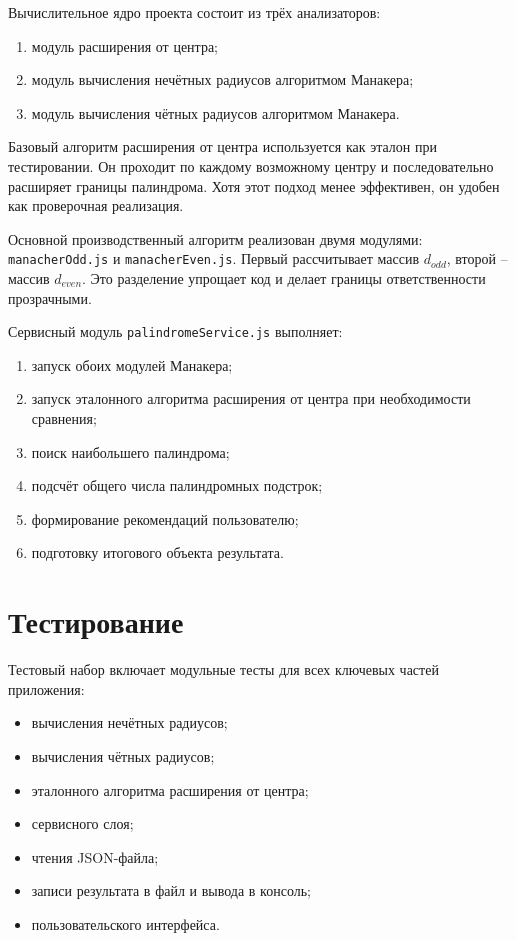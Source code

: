 Вычислительное ядро проекта состоит из трёх анализаторов:
\begin{enumerate}
    \item модуль расширения от центра;
    \item модуль вычисления нечётных радиусов алгоритмом Манакера;
    \item модуль вычисления чётных радиусов алгоритмом Манакера.
\end{enumerate}

Базовый алгоритм расширения от центра используется как эталон при тестировании.
Он проходит по каждому возможному центру и последовательно расширяет границы палиндрома.
Хотя этот подход менее эффективен, он удобен как проверочная реализация.

Основной производственный алгоритм реализован двумя модулями: \texttt{manacherOdd.js} и \texttt{manacherEven.js}.
Первый рассчитывает массив $d_{odd}$, второй -- массив $d_{even}$.
Это разделение упрощает код и делает границы ответственности прозрачными.

Сервисный модуль \texttt{palindromeService.js} выполняет:
\begin{enumerate}
    \item запуск обоих модулей Манакера;
    \item запуск эталонного алгоритма расширения от центра при необходимости сравнения;
    \item поиск наибольшего палиндрома;
    \item подсчёт общего числа палиндромных подстрок;
    \item формирование рекомендаций пользователю;
    \item подготовку итогового объекта результата.
\end{enumerate}

\section{Тестирование} \label{ch5:sec4}

Тестовый набор включает модульные тесты для всех ключевых частей приложения:
\begin{itemize}
    \item вычисления нечётных радиусов;
    \item вычисления чётных радиусов;
    \item эталонного алгоритма расширения от центра;
    \item сервисного слоя;
    \item чтения JSON-файла;
    \item записи результата в файл и вывода в консоль;
    \item пользовательского интерфейса.
\end{itemize}

